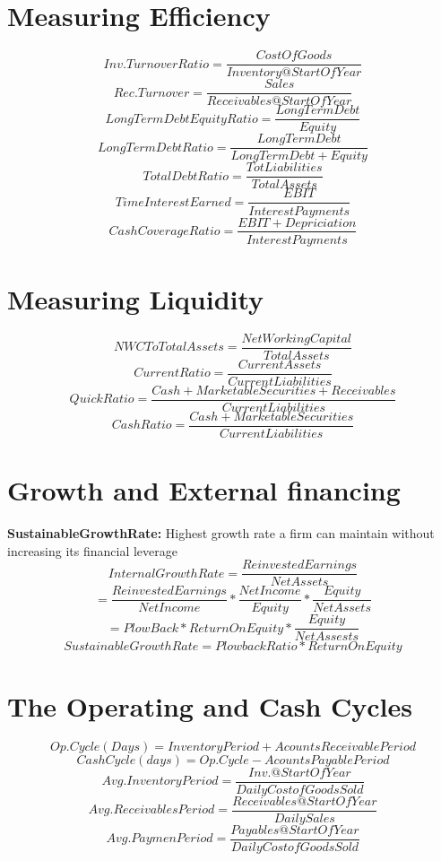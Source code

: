 \documentclass{cheatsheet}
\begin{document}
\section{Measuring Efficiency}
\[Inv.TurnoverRatio = \frac{CostOfGoods}{Inventory@StartOfYear}\]
\[Rec.Turnover = \frac{Sales}{Receivables@StartOfYear}\]
\[LongTermDebtEquityRatio = \frac{LongTermDebt}{Equity}\]
\[LongTermDebtRatio = \frac{LongTermDebt}{LongTermDebt+Equity}\]
\[TotalDebtRatio = \frac{TotLiabilities}{TotalAssets}\]
\[TimeInterestEarned = \frac{EBIT}{InterestPayments}\]
\[CashCoverageRatio = \frac{EBIT+Depriciation}{InterestPayments}\]
\section{Measuring Liquidity}
\[NWCToTotalAssets = \frac{NetWorkingCapital}{TotalAssets}\]
\[CurrentRatio = \frac{CurrentAssets}{CurrentLiabilities}\]
\[QuickRatio = \frac{Cash+MarketableSecurities + Receivables}{CurrentLiabilities}\]
\[CashRatio = \frac{Cash+MarketableSecurities}{CurrentLiabilities}\]
\section{Growth and External financing}
\textbf{SustainableGrowthRate:} Highest growth rate a firm can maintain without
increasing its financial leverage
\[InternalGrowthRate = \frac{ReinvestedEarnings}{NetAssets}\]
\[= \frac{ReinvestedEarnings}{NetIncome}*\frac{NetIncome}{Equity}*\frac{Equity}{NetAssets}\]
\[= PlowBack * ReturnOnEquity * \frac{Equity}{NetAssests}\]
\[SustainableGrowthRate = PlowbackRatio * ReturnOnEquity\]
\section{The Operating and Cash Cycles}
\[Op.Cycle(Days)=InventoryPeriod+AcountsReceivablePeriod\]
\[CashCycle(days)=Op.Cycle-AcountsPayablePeriod\]
\vspace{40mm}
\[Avg.InventoryPeriod = \frac{Inv.@StartOfYear}{DailyCostofGoodsSold}\]
\[Avg.ReceivablesPeriod = \frac{Receivables@StartOfYear}{DailySales}\]
\[Avg.PaymenPeriod = \frac{Payables@StartOfYear}{DailyCostofGoodsSold}\]
\end{document}
